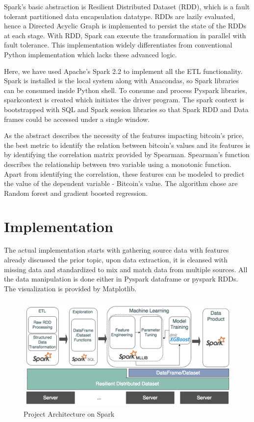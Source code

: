 \documentclass[sigconf]{acmart}
\begin{document}
Spark's basic abstraction is Resilient Distributed Dataset (RDD), which is a fault tolerant partitioned data encapsulation datatype. RDDs are lazily evaluated, hence a Directed Acyclic Graph is implemented to persist the state of the RDDs at each stage. With RDD, Spark can execute the transformation in parallel with fault tolerance. This implementation widely differentiates from conventional Python implementation which lacks these advanced logic.  

Here, we have used Apache's Spark 2.2 to implement all the ETL functionality. Spark is installed is the local system along with Anacondas, so Spark libraries can be consumed inside Python shell. To consume and process Pyspark libraries, sparkcontext is created which initiates the driver program. The spark context is bootstrapped with SQL and Spark session libraries so that Spark RDD and Data frames could be accessed under a single window.

As the abstract describes the necessity of the features impacting bitcoin's price, the best metric to identify the relation between bitcoin's values and its features is by identifying the correlation matrix provided by Spearman. Spearman's function describes the relationship between two variable using a monotonic function\cite{Spearman9:online}. Apart from identifying the correlation, these features can be modeled to predict the value of the dependent variable - Bitcoin's value. The algorithm chose are Random forest and gradient boosted regression.

\section{Implementation}
The actual implementation starts with gathering source data with features already discussed the prior topic, upon data extraction, it is cleansed with missing data and standardized to mix and match data from multiple sources. All the data manipulation is done either in Pyspark dataframe or pyspark RDDs. The visualization is provided by Matplotlib.

\begin{figure}[!ht]
  \centering\includegraphics[width=\columnwidth]{images/Projectflow.png}
  \caption{Project Architecture on Spark}
  \label{Architecture:spark}
\end{figure}
\end{document}
